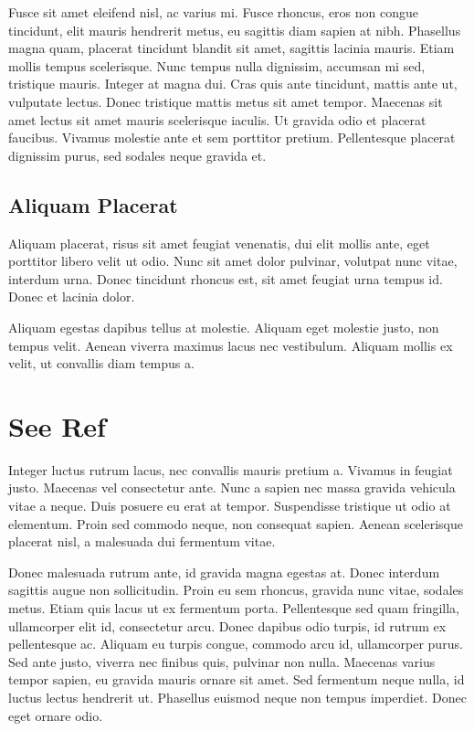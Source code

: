 \documentclass{article}
\begin{document}
Fusce sit amet eleifend nisl, ac varius mi. 
Fusce rhoncus, eros non congue tincidunt, elit mauris hendrerit metus, eu sagittis diam sapien at nibh. 
Phasellus magna quam, placerat tincidunt blandit sit amet, sagittis lacinia mauris. 
Etiam mollis tempus scelerisque. 
Nunc tempus nulla dignissim, accumsan mi sed, tristique mauris. 
Integer at magna dui. 
Cras quis ante tincidunt, mattis ante ut, vulputate lectus. 
Donec tristique mattis metus sit amet tempor. 
Maecenas sit amet lectus sit amet mauris scelerisque iaculis. 
Ut gravida odio et placerat faucibus. 
Vivamus molestie ante et sem porttitor pretium. 
Pellentesque placerat dignissim purus, sed sodales neque gravida et.

\subsection{Aliquam Placerat}
Aliquam placerat, risus sit amet feugiat venenatis, dui elit mollis ante, eget porttitor libero velit ut odio. 
Nunc sit amet dolor pulvinar, volutpat nunc vitae, interdum urna. 
Donec tincidunt rhoncus est, sit amet feugiat urna tempus id. 
Donec et lacinia dolor.


Aliquam egestas dapibus tellus at molestie. 
Aliquam eget molestie justo, non tempus velit. 
Aenean viverra maximus lacus nec vestibulum. 
Aliquam mollis ex velit, ut convallis diam tempus a.

\newpage

\section{See Ref}
Integer luctus rutrum lacus, nec convallis mauris pretium a. 
Vivamus \cite{knuth-fa} in feugiat justo. 
Maecenas vel consectetur ante. 
Nunc a sapien nec massa \cite{knuthwebsite} gravida vehicula vitae a neque. 
Duis posuere eu erat at tempor. 
Suspendisse tristique ut odio at elementum. 
Proin sed commodo neque, non consequat sapien. 
Aenean scelerisque placerat nisl, a malesuada dui fermentum vitae.


Donec malesuada rutrum ante, id gravida magna egestas at. 
Donec interdum sagittis augue non sollicitudin. 
Proin eu sem rhoncus, gravida nunc vitae, sodales metus. 
Etiam quis lacus ut ex \cite{einstein} fermentum porta. 
Pellentesque sed quam fringilla, ullamcorper elit id, consectetur arcu. 
Donec dapibus odio turpis, id rutrum ex pellentesque ac. 
Aliquam eu turpis congue, commodo arcu id, ullamcorper purus. 
Sed ante \cite{dirac}\cite{einstein} justo, viverra nec finibus quis, pulvinar non nulla. 
Maecenas varius tempor sapien, eu gravida mauris ornare sit amet. 
Sed fermentum neque nulla, id luctus lectus hendrerit ut. 
Phasellus euismod neque non tempus imperdiet. 
Donec eget ornare odio.

\newpage


\printglossary[title=Notation, nonumberlist]
\glsaddall[] %
\end{document}
